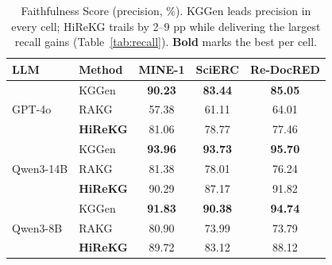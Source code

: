 \documentclass[11pt]{article}
\begin{document}
\begin{table}[t!]
\centering
\small
\setlength{\tabcolsep}{4pt}
\begin{tabular}{ll|ccc}
\toprule
\textbf{LLM} & \textbf{Method} & \textbf{MINE-1} & \textbf{SciERC} & \textbf{Re-DocRED} \\
\midrule
\multirow{3}{*}{GPT-4o} 
& KGGen           & \textbf{90.23} & \textbf{83.44} & \textbf{85.05} \\
& RAKG            & 57.38          & 61.11          & 64.01 \\
& \textbf{HiReKG} & 81.06          & 78.77          & 77.46 \\
\midrule
\multirow{3}{*}{Qwen3-14B} 
& KGGen           & \textbf{93.96} & \textbf{93.73} & \textbf{95.70} \\
& RAKG            & 81.38          & 78.01          & 76.24 \\
& \textbf{HiReKG} & 90.29          & 87.17          & 91.82 \\
\midrule
\multirow{3}{*}{Qwen3-8B} 
& KGGen           & \textbf{91.83} & \textbf{90.38} & \textbf{94.74} \\
& RAKG            & 80.90          & 73.99          & 73.79 \\
& \textbf{HiReKG} & 89.72          & 83.12          & 88.12 \\
\bottomrule
\end{tabular}
\caption{Faithfulness Score (precision, \%). KGGen leads precision in every cell; HiReKG trails by 2--9 pp while delivering the largest recall gains (Table~\ref{tab:recall}). \textbf{Bold} marks the best per cell.}
\label{tab:faith}
\end{table}
\end{document}
